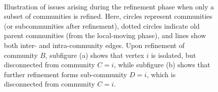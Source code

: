\begin{figure}[hbtp]
  \centering
   \\[-1ex]
  \caption{Illustration of issues arising during the refinement phase when only a subset of communities is refined. Here, circles represent communities (or subcommunities after refinement), dotted circles indicate old parent communities (from the local-moving phase), and lines show both inter- and intra-community edges. Upon refinement of community $B$, subfigure (a) shows that vertex $i$ is isolated, but disconnected from community $C = i$, while subfigure (b) shows that further refinement forms sub-community $D = i$, which is disconnected from community $C = i$.}
  \label{fig:subrefine-issue}
\end{figure}
